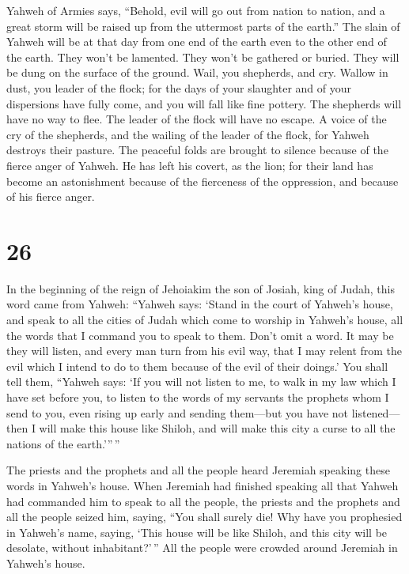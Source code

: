  Yahweh of Armies says, ``Behold, evil will go out from
nation to nation, and a great storm will be raised up from the uttermost
parts of the earth.''  The slain of Yahweh will be at
that day from one end of the earth even to the other end of the earth.
They won't be lamented. They won't be gathered or buried. They will be
dung on the surface of the ground.  Wail, you shepherds,
and cry. Wallow in dust, you leader of the flock; for the days of your
slaughter and of your dispersions have fully come, and you will fall
like fine pottery.  The shepherds will have no way to
flee. The leader of the flock will have no escape.  A
voice of the cry of the shepherds, and the wailing of the leader of the
flock, for Yahweh destroys their pasture.  The peaceful
folds are brought to silence because of the fierce anger of Yahweh.
 He has left his covert, as the lion; for their land has
become an astonishment because of the fierceness of the oppression, and
because of his fierce anger.

\hypertarget{section-25}{%
\section{26}\label{section-25}}

 In the beginning of the reign of Jehoiakim the son of
Josiah, king of Judah, this word came from Yahweh: 
``Yahweh says: `Stand in the court of Yahweh's house, and speak to all
the cities of Judah which come to worship in Yahweh's house, all the
words that I command you to speak to them. Don't omit a word.
 It may be they will listen, and every man turn from his
evil way, that I may relent from the evil which I intend to do to them
because of the evil of their doings.'  You shall tell
them, ``Yahweh says: `If you will not listen to me, to walk in my law
which I have set before you,  to listen to the words of my
servants the prophets whom I send to you, even rising up early and
sending them---but you have not listened---  then I will
make this house like Shiloh, and will make this city a curse to all the
nations of the earth.'''\,''

 The priests and the prophets and all the people heard
Jeremiah speaking these words in Yahweh's house.  When
Jeremiah had finished speaking all that Yahweh had commanded him to
speak to all the people, the priests and the prophets and all the people
seized him, saying, ``You shall surely die!  Why have you
prophesied in Yahweh's name, saying, `This house will be like Shiloh,
and this city will be desolate, without inhabitant?'\,'' All the people
were crowded around Jeremiah in Yahweh's house.


